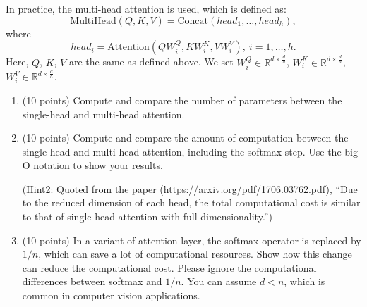 \documentclass[11pt]{article}
\begin{document}
\begin{enumerate}
    In practice, the multi-head attention is used, which is defined as:
    $$\mbox{MultiHead}(Q,K,V)=\mbox{Concat}(head_1, \ldots, head_h),$$
    where
    $$head_i=\mbox{Attention}(QW^Q_i,KW^K_i,VW^V_i),\ i=1,\ldots,h.$$
    Here, $Q$, $K$, $V$ are the same as defined above. We set $W^Q_i \in \mathbb{R}^{d \times \frac{d}{h}}$, $W^K_i \in \mathbb{R}^{d \times \frac{d}{h}}$, $W^V_i \in \mathbb{R}^{d \times \frac{d}{h}}$.

    \begin{enumerate}
        \item (10 points) Compute and compare the number of parameters between the single-head and multi-head attention.
        \item (10 points) Compute and compare the amount of computation between the single-head and multi-head attention, including the softmax step. Use the big-O notation to show your results.

        (Hint2: Quoted from the paper (\url{https://arxiv.org/pdf/1706.03762.pdf}), ``Due to the reduced dimension of each head, the total computational cost is similar to that of single-head attention with full dimensionality.'')

        \item (10 points) In a variant of attention layer, the softmax operator is replaced by $1/n$, which can save a lot of computational resources. Show how this change can reduce the computational cost. Please ignore the computational differences between softmax and $1/n$. You can assume $d < n$, which is common in computer vision applications.
    \end{enumerate}

\end{enumerate}
\end{document}
